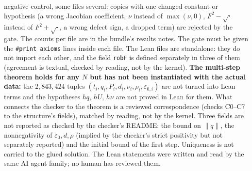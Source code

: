 \documentclass[11pt]{article}
\newcommand{\nrm}[1]{\lVert #1\rVert}
\begin{document}
negative control, some files several: copies with one changed constant or hypothesis (a wrong Jacobian coefficient, $\nu$ instead of $\max(\nu,0)$, $F^2-\sqrt{\cdot}$ instead of $F^2+\sqrt{\cdot}$, a wrong
defect sign, a dropped term) are rejected by the gate. The counts per file are in the bundle's results notes. The gate must be given the \texttt{\#print axioms} lines inside each file. The Lean files are standalone: they do not import each other, and the field \texttt{robF} is defined separately in three of them (agreement is textual, checked by reading, not by the kernel). \textbf{The multi-step theorem holds for any $N$ but has not been instantiated with the actual data:}
the $2{,}843{,}424$ tuples $(t_i,q_i,P_i,d_i,\nu_i,\rho_i,\varepsilon_{0,i})$ are not turned into Lean terms and the hypotheses $hq$, $hU$, $h\nu$ are not proved in Lean for them. What connects the checker to the theorem is a reviewed correspondence (checks C0--C7 to the structure's fields),
matched by reading, not by the kernel. Three fields are not reported as checked by the checker's README: the bound on $\nrm{q}$, the nonnegativity of $\varepsilon_{0},d,\rho$ (implied by the checker's strict positivity but not separately reported) and the initial bound of the first step.
Uniqueness is not carried to the glued solution. The Lean statements were written and read by the same AI agent family; no human has reviewed them.
\end{document}
